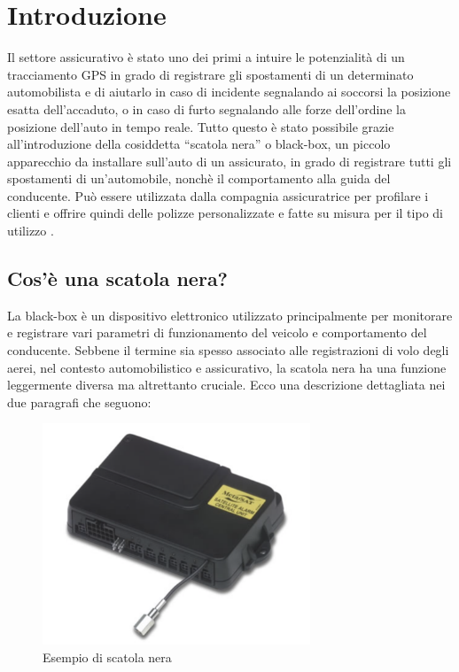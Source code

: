 \documentclass[12pt, a4paper, italian]{report}
\numberwithin{figure}{chapter}
\numberwithin{table}{chapter}
\begin{document}
\chapter{Introduzione}
Il settore assicurativo è stato uno dei primi a intuire le potenzialità di un tracciamento GPS in grado di registrare gli spostamenti di un determinato automobilista
e di aiutarlo in caso di incidente segnalando ai soccorsi la posizione esatta dell'accaduto, o in caso di furto segnalando alle forze dell'ordine la posizione dell'auto in
tempo reale. Tutto questo è stato possibile grazie all'introduzione della cosiddetta
“scatola nera” o black-box, un piccolo apparecchio da installare sull'auto di un
assicurato, in grado di registrare tutti gli spostamenti di un'automobile, nonchè il
comportamento alla guida del conducente. Può essere utilizzata dalla compagnia
assicuratrice per profilare i clienti e offrire quindi delle polizze personalizzate e fatte su misura per il tipo di utilizzo
\cite{fracassi2012}.
\section{Cos'è una scatola nera?}
La black-box è un dispositivo elettronico utilizzato principalmente per monitorare e registrare vari parametri di funzionamento del veicolo e comportamento del conducente. Sebbene il termine sia spesso associato alle registrazioni di volo degli aerei, nel contesto automobilistico e assicurativo, la scatola nera ha una funzione leggermente diversa ma altrettanto cruciale. Ecco una descrizione dettagliata nei due paragrafi che seguono:

\begin{figure}[h] \centering
\includegraphics[width=8cm]{esempioScatolaNera.png}
\caption{Esempio di scatola nera\protect\footnotemark}
\label{fig:scatolaNera}
\end{figure}
\end{document}
